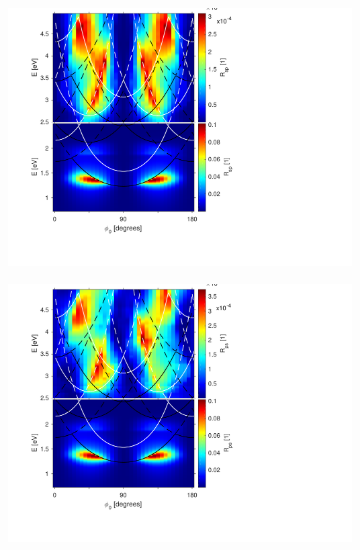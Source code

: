\begin{figure}  %
    \begin{subfigure}{0.49\textwidth}
        \centering
        \includegraphics[width=\linewidth, trim=1.2cm  1.8cm 6.5cm 0.3cm, clip]{figures/ch4/S5B/contour/S5B_Rsp.pdf}
        \caption{}
    \end{subfigure}
    \begin{subfigure}{0.49\textwidth}
        \centering
        \includegraphics[width=\linewidth, trim=1.2cm  1.8cm 6.5cm 0.3cm, clip]{figures/ch4/S5B/contour/S5B_Rps.pdf}
        \caption{}
    \end{subfigure}
    

\end{figure}
